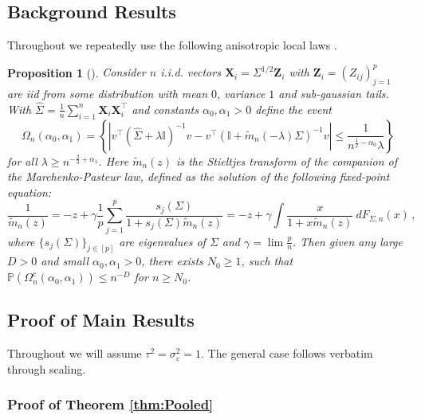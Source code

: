 \documentclass{article}
\theoremstyle{plain}
\newtheorem{proposition}[theorem]{Proposition}
\theoremstyle{remark}
\def \bX{\mathbf{X}}
\def \bX{\boldsymbol{X}}
\begin{document}
\subsection{Background Results} Throughout we repeatedly use the following anisotropic local laws \citep{knowles2017anisotropic}.
\begin{proposition}[\citep{knowles2017anisotropic}]\label{prop:prop_anisotropic_local_law}
Consider $n$ i.i.d. vectors    $\bX_i = \Sigma^{1/2}\mathbf{Z}_i $ with $\mathbf{Z}_i=(Z_{ij})_{j=1}^p$ are iid from some distribution with mean $0$, variance $1$ and sub-gaussian tails. With $\hat{\Sigma}=\frac{1}{n}\sum\limits_{i=1}^n \bX_i\bX_i^\top$ and constants $\alpha_0,\alpha_1>0$ define the event
    $$
    \Omega_n(\alpha_0,\alpha_1) = \left\{ \left| v^\top (\hat \Sigma + \lambda \mathbb{I})^{-1}v - v^\top \left(\mathbb{I} + \tilde m_n(-\lambda) \Sigma\right)^{-1}v \right| \le \frac{1}{n^{\frac12 - \alpha_0}\lambda}\right\}
    $$
    for all $\lambda \ge n^{-\frac23 + \alpha_1}$.
    Here $\tilde m_n(z)$ is the Stieltjes transform of the companion of the Marchenko-Pasteur law, defined as the solution of the following fixed-point equation: 
    \begin{equation}
    \label{eq:comp_MP}
    \frac{1}{\tilde m_n(z)} = - z + \gamma \frac1p\sum_{j = 1}^p \frac{s_j(\Sigma)}{1 + s_j(\Sigma)\tilde m_n(z)} = -z + \gamma \int \frac{x}{1 + x \tilde m_n(z)} \ dF_{\Sigma, n}(x) \,,
    \end{equation}
    where $\{s_j(\Sigma)\}_{j \in [p]}$ are eigenvalues of $\Sigma$ and $\gamma=\lim \frac{p}{n}$. 
    Then given any large $D > 0$ and small $\alpha_0, \alpha_1 > 0$, there exists $N_0 \geq 1$, such that $\mathbb{P}(\Omega_n^c(\alpha_0,\alpha_1)) \le n^{-D}$ for $n \ge N_0$.
\end{proposition}

\subsection{Proof of Main Results} Throughout we will assume $\tau^2=\sigma_{\varepsilon}^2=1$. The general case follows verbatim through scaling.
\subsubsection{Proof of Theorem \ref{thm:Pooled}}
\end{document}
